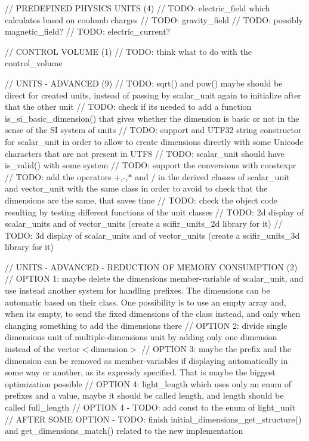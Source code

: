 // PREDEFINED PHYSICS UNITS (4) // TODO\+: electric\+\_\+field which calculates based on coulomb charges // TODO\+: gravity\+\_\+field // TODO\+: possibly magnetic\+\_\+field? // TODO\+: electric\+\_\+current?

// CONTROL VOLUME (1) // TODO\+: think what to do with the control\+\_\+volume

// UNITS -\/ ADVANCED (9) // TODO\+: sqrt() and pow() maybe should be direct for created units, instead of passing by scalar\+\_\+unit again to initialize after that the other unit // TODO\+: check if it\textquotesingle{}s needed to add a function is\+\_\+si\+\_\+basic\+\_\+dimension() that gives whether the dimension is basic or not in the sense of the SI system of units // TODO\+: support and UTF32 string constructor for scalar\+\_\+unit in order to allow to create dimensions directly with some Unicode characters that are not present in UTF8 // TODO\+: scalar\+\_\+unit should have is\+\_\+valid() with some system // TODO\+: support the conversions with constexpr // TODO\+: add the operators +,-\/,\texorpdfstring{$\ast$}{*} and / in the derived classes of scalar\+\_\+unit and vector\+\_\+unit with the same class in order to avoid to check that the dimensions are the same, that saves time // TODO\+: check the object code resulting by testing different functions of the unit classes // TODO\+: 2d display of scalar\+\_\+units and of vector\+\_\+units (create a scifir\+\_\+units\+\_\+2d library for it) // TODO\+: 3d display of scalar\+\_\+units and of vector\+\_\+units (create a scifir\+\_\+units\+\_\+3d library for it)

// UNITS -\/ ADVANCED -\/ REDUCTION OF MEMORY CONSUMPTION (2) // OPTION 1\+: maybe delete the dimensions member-\/variable of scalar\+\_\+unit, and use instead another system for handling prefixes. The dimensions can be automatic based on their class. One possibility is to use an empty array and, when it\textquotesingle{}s empty, to send the fixed dimensions of the class instead, and only when changing something to add the dimensions there // OPTION 2\+: divide single dimensions unit of multiple-\/dimensions unit by adding only one dimension instead of the vector$<$dimension$>$ // OPTION 3\+: maybe the prefix and the dimension can be removed as member-\/variables if displaying automatically in some way or another, as it\textquotesingle{}s expressly specified. That is maybe the biggest optimization possible // OPTION 4\+: light\+\_\+length which uses only an enum of prefixes and a value, maybe it should be called length, and length should be called full\+\_\+length // OPTION 4 -\/ TODO\+: add const to the enum of light\+\_\+unit // AFTER SOME OPTION -\/ TODO\+: finish initial\+\_\+dimensions\+\_\+get\+\_\+structure() and get\+\_\+dimensions\+\_\+match() related to the new implementation

